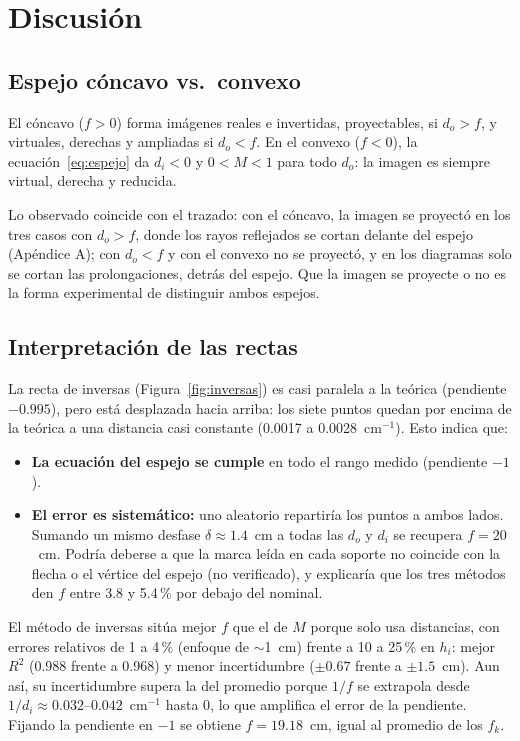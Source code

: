 \documentclass[11pt,a4paper]{article}
\begin{document}
\section{Discusión}

\subsection{Espejo cóncavo vs.\ convexo}
El cóncavo ($f > 0$) forma imágenes reales e invertidas, proyectables, si $d_o > f$, y virtuales, derechas y ampliadas si $d_o < f$. En el convexo ($f < 0$), la ecuación~\eqref{eq:espejo} da $d_i < 0$ y $0 < M < 1$ para todo $d_o$: la imagen es siempre virtual, derecha y reducida.

Lo observado coincide con el trazado: con el cóncavo, la imagen se proyectó en los tres casos con $d_o > f$, donde los rayos reflejados se cortan delante del espejo (Apéndice A); con $d_o < f$ y con el convexo no se proyectó, y en los diagramas solo se cortan las prolongaciones, detrás del espejo. Que la imagen se proyecte o no es la forma experimental de distinguir ambos espejos.

\subsection{Interpretación de las rectas}
\label{sec:disc_inversas}
La recta de inversas (Figura~\ref{fig:inversas}) es casi paralela a la teórica (pendiente $-0.995$), pero está desplazada hacia arriba: los siete puntos quedan por encima de la teórica a una distancia casi constante (0.0017 a 0.0028~cm$^{-1}$). Esto indica que:
\begin{itemize}
  \item \textbf{La ecuación del espejo se cumple} en todo el rango medido (pendiente $-1$).
  \item \textbf{El error es sistemático:} uno aleatorio repartiría los puntos a ambos lados. Sumando un mismo desfase $\delta \approx 1.4$~cm a todas las $d_o$ y $d_i$ se recupera $f = 20$~cm. Podría deberse a que la marca leída en cada soporte no coincide con la flecha o el vértice del espejo (no verificado), y explicaría que los tres métodos den $f$ entre 3.8 y 5.4\,\% por debajo del nominal.
\end{itemize}

El método de inversas sitúa mejor $f$ que el de $M$ porque solo usa distancias, con errores relativos de 1 a 4\,\% (enfoque de $\sim$1~cm) frente a 10 a 25\,\% en $h_i$: mejor $R^2$ (0.988 frente a 0.968) y menor incertidumbre ($\pm 0.67$ frente a $\pm 1.5$~cm). Aun así, su incertidumbre supera la del promedio porque $1/f$ se extrapola desde $1/d_i \approx 0.032$--$0.042$~cm$^{-1}$ hasta 0, lo que amplifica el error de la pendiente. Fijando la pendiente en $-1$ se obtiene $f = 19.18$~cm, igual al promedio de los $f_k$.
\end{document}

